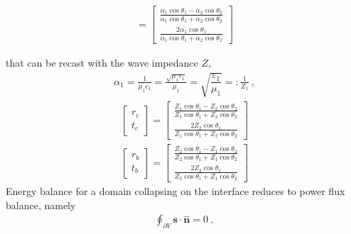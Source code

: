 \documentclass[letterpaper,10pt,english]{jupyterBook}
\begin{document}
\begin{equation*}
\begin{split}
= \begin{bmatrix} \frac{\alpha_1 \cos \theta_1 - \alpha_2 \cos \theta_2}{\alpha_1 \cos \theta_1 + \alpha_2 \cos \theta_2} \\ \frac{2 \alpha_1 \cos \theta_1}{\alpha_1 \cos \theta_1 + \alpha_2 \cos \theta_2} \end{bmatrix}
\end{split}
\end{equation*}


\sphinxAtStartPar
that can be recast with the wave impedance \(Z\),
\begin{equation*}
\begin{split}\alpha_1 = \frac{1}{\mu_1 c_1} = \frac{\sqrt{\mu_1 \varepsilon_1}}{\mu_1} = \sqrt{\dfrac{\varepsilon_1}{\mu_1}} =: \frac{1}{Z_1} \ ,\end{split}
\end{equation*}\begin{equation*}
\begin{split}
\begin{bmatrix} r_c \\ t_c \end{bmatrix} = \begin{bmatrix} \frac{Z_1 \cos \theta_1 - Z_2 \cos \theta_2}{Z_1 \cos \theta_1 + Z_2 \cos \theta_2} \\ \frac{2 Z_2 \cos \theta_1}{Z_1 \cos \theta_1 + Z_2 \cos \theta_2} \end{bmatrix}
\end{split}
\end{equation*}\begin{equation*}
\begin{split}
\begin{bmatrix} r_b \\ t_b \end{bmatrix} = \begin{bmatrix} \frac{Z_2 \cos \theta_1 - Z_1 \cos \theta_2}{Z_2 \cos \theta_1 + Z_1 \cos \theta_2} \\ \frac{2 Z_2 \cos \theta_1}{Z_2 \cos \theta_1 + Z_1 \cos \theta_2} \end{bmatrix}
\end{split}
\end{equation*}
\sphinxAtStartPar
{} Energy balance for a domain collapsing on the interface reduces to power flux balance, namely
\begin{equation*}
\begin{split}\oint_{\partial V} \mathbf{s} \cdot \hat{\mathbf{n}} = 0 \ ,\end{split}
\end{equation*}
\end{document}
